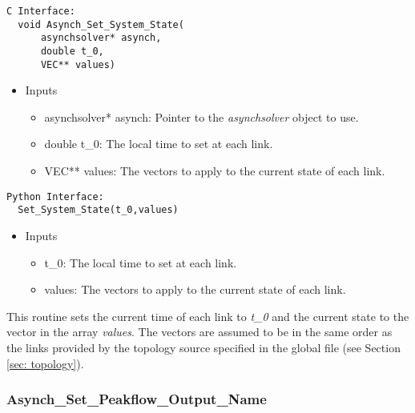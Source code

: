 \documentclass[12pt]{article}
\begin{document}
\begin{lstlisting}[style=CStyle]
  C Interface:
  void Asynch_Set_System_State(
      asynchsolver* asynch,
      double t_0,
      VEC** values)
\end{lstlisting}
\begin{itemize}
 \item Inputs
  \begin{itemize}
   \item asynchsolver* asynch: Pointer to the \emph{asynchsolver} object to use.
   \item double t\_0: The local time to set at each link.
   \item VEC** values: The vectors to apply to the current state of each link.
  \end{itemize}
\end{itemize}
\begin{lstlisting}[style=PythonStyle]
  Python Interface:
  Set_System_State(t_0,values)
\end{lstlisting}
\begin{itemize}
 \item Inputs
  \begin{itemize}
   \item t\_0: The local time to set at each link.
   \item values: The vectors to apply to the current state of each link.
  \end{itemize}
\end{itemize}
This routine sets the current time of each link to \emph{t\_0} and the current state to the vector in the array \emph{values}. The vectors are assumed to be in the same order as the links provided by the topology source specified in the global file (see Section \ref{sec: topology}).


\subsubsection{Asynch\_Set\_Peakflow\_Output\_Name} \label{sec: asynch_set_peakflow_output_name}
\end{document}

